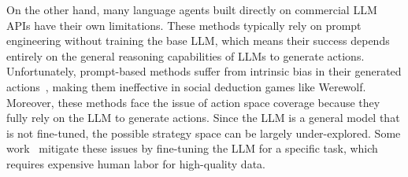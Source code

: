 On the other hand, many language agents built directly on commercial LLM APIs have their own limitations. 
These methods typically rely on prompt engineering without training the base LLM, which means their success depends entirely on the general reasoning capabilities of LLMs to generate actions. 
Unfortunately, prompt-based methods suffer from intrinsic bias in their generated actions~\cite{xu2023language}, making them ineffective in social deduction games like Werewolf. Moreover, these methods face the issue of action space coverage because they fully rely on the LLM to generate actions. Since the LLM is a general model that is not fine-tuned, the possible strategy space can be largely under-explored. Some work~\cite{chen2023fireact,wu2024enhance} mitigate these issues by fine-tuning the LLM for a specific task, which requires expensive human labor for high-quality data.
